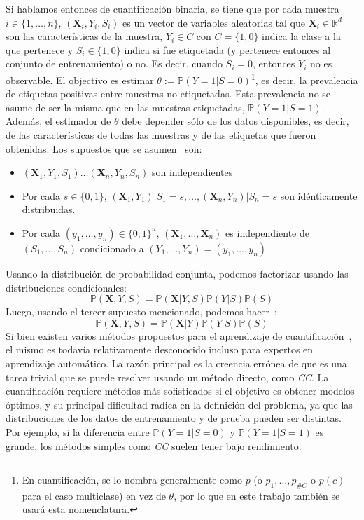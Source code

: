 Si hablamos entonces de cuantificación binaria, se tiene que por cada muestra $i
\in \{1,\dots,n\}$, $(\boldsymbol{X}_i,Y_i,S_i)$ es un vector de variables
aleatorias tal que $\boldsymbol{X}_i \in \mathbb{R}^d$ son las características
de la muestra, $Y_i \in C$ con $C=\{1,0\}$ indica la clase a la que pertenece y
$S_i \in \{1,0\}$ indica si fue etiquetada (y pertenece entonces al conjunto de
entrenamiento) o no. Es decir, cuando $S_i=0$, entonces $Y_i$ no es observable.
El objectivo es estimar $\theta:= \mathbb{P}(Y=1|S=0)$\footnote{En
cuantificación, se lo nombra generalmente como $p$ (o $p_1,\dots,p_{\#C}$ o
$p(c)$ para el caso multiclase) en vez de $\theta$, por lo que en este trabajo
también se usará esta nomenclatura.}, es decir, la prevalencia de etiquetas
positivas entre muestras no etiquetadas. Esta prevalencia no se asume de ser la
misma que en las muestras etiquetadas, $\mathbb{P}(Y=1|S=1)$. Además, el
estimador de $\theta$ debe depender sólo de los datos disponibles, es decir, de
las características de todas las muestras y de las etiquetas que fueron
obtenidas. Los supuestos que se asumen~\cite{vaz2019quantification} son:

\begin{itemize}
  \item $(\boldsymbol{X}_1,Y_1,S_1) \dots (\boldsymbol{X}_n,Y_n,S_n)$ son
  independientes
  \item Por cada $s \in \{0,1\}$,
  $(\boldsymbol{X}_1,Y_1)|S_1=s,\dots,(\boldsymbol{X}_n,Y_n)|S_n=s$ son
  idénticamente distribuidas.
  \item Por cada $(y_1,\dots,y_n)\in{\{0,1\}}^n$,
  $(\boldsymbol{X}_1,\dots,\boldsymbol{X}_n)$ es independiente de
  $(S_1,\dots,S_n)$ condicionado a $(Y_1,\dots,Y_n)=(y_1,\dots,y_n)$
\end{itemize}

Usando la distribución de probabilidad conjunta, podemos factorizar usando las
distribuciones condicionales:
\begin{equation}
    \mathbb{P}(\boldsymbol{X},Y,S)=\mathbb{P}(\boldsymbol{X}|Y,S)\mathbb{P}(Y|S)\mathbb{P}(S)
\end{equation}
Luego, usando el tercer supuesto mencionado, podemos
hacer~\cite{moreno2012unifying}:
\begin{equation}
    \mathbb{P}(\boldsymbol{X},Y,S)=\mathbb{P}(\boldsymbol{X}|Y)\mathbb{P}(Y|S)\mathbb{P}(S)
\end{equation}
Si bien existen varios métodos propuestos para el aprendizaje de
cuantificación~\cite{esuli2023learning, gonzalez2017review}, el mismo es todavía
relativamente desconocido incluso para expertos en aprendizaje automático. La
razón principal es la creencia errónea de que es una tarea trivial que se puede
resolver usando un método directo, como {\it CC}. La cuantificación requiere
métodos más sofisticados si el objetivo es obtener modelos óptimos, y su
principal dificultad radica en la definición del problema, ya que las
distribuciones de los datos de entrenamiento y de prueba pueden ser distintas.
Por ejemplo, si la diferencia entre $\mathbb{P}(Y=1|S=0)$ y
$\mathbb{P}(Y=1|S=1)$ es grande, los métodos simples como {\it CC\/} suelen
tener bajo rendimiento.

